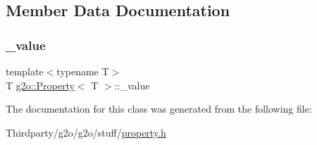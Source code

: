 \subsection{Member Data Documentation}
\mbox{\label{classg2o_1_1_property_ae51b1fe0e0a1f0d9a2bcbef7ea3afcf7}} 
\subsubsection{\texorpdfstring{\+\_\+value}{\_value}}
{\footnotesize\ttfamily template$<$typename T$>$ \\
T \mbox{\hyperlink{classg2o_1_1_property}{g2o\+::\+Property}}$<$ T $>$\+::\+\_\+value\hspace{0.3cm}{\ttfamily [protected]}}



The documentation for this class was generated from the following file\+:\begin{DoxyCompactItemize}
\item 
Thirdparty/g2o/g2o/stuff/\mbox{\hyperlink{property_8h}{property.\+h}}\end{DoxyCompactItemize}
